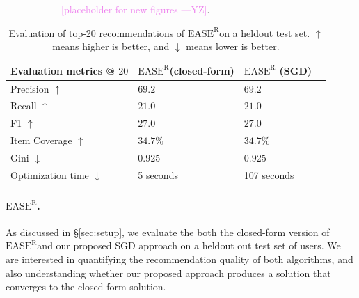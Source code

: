 \documentclass{article}
\newcommand{\easer}{$\text{EASE}^\text{R}$}
\newcommand{\yiming}[1]{\textcolor{violet}{[#1 ---\textsc{YZ}]}}
\newcommand{\secref}[1]{\S\ref{#1}}
\begin{document}
\begin{figure}[h]
\begin{subfigure}[b]{0.4\textwidth}
		\caption{\yiming{placeholder for new figures}.}
	\end{subfigure}
	\caption{}
	\label{fig:1}
\end{figure}

\begin{table}[h]
	\centering
	\begin{tabular}{@{}llll@{}}
		\toprule
		Evaluation metrics @ $20$     & \easer (closed-form) & \easer
		(SGD)
		\\ \midrule
		Precision $\uparrow$          & $69.2$               & $69.2$
		\\
		Recall	$\uparrow$              & $21.0$               &
		$21.0$
		\\
		F1	$\uparrow$                  & $27.0$               &
		$27.0$
		\\
		Item Coverage	$\uparrow$       & $34.7\%$             &
		$34.7\%$
		\\
		Gini	$\downarrow$              & $0.925$              &
		$0.925$
		\\
		Optimization time	$\downarrow$ & 5 seconds
		                              & 107 seconds
		\\ \bottomrule
	\end{tabular}
	\caption{Evaluation of top-20 recommendations of \easer on a heldout
		test set. $\uparrow$ means higher is better, and $\downarrow$
		means
		lower is better.}
	\label{tab:easer-results}

\end{table}

\paragraph*{\easer.}
As discussed in \secref{sec:setup}, we evaluate the both the closed-form
 version of \easer and our proposed SGD approach on a heldout out test set of
 users.
We are interested in quantifying the recommendation quality of both algorithms,
 and also understanding whether our proposed approach produces a solution that
 converges to the closed-form solution.
\end{document}
